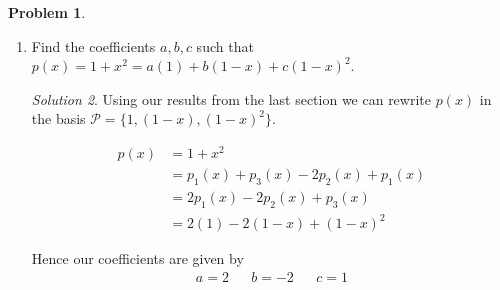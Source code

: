 \documentclass[12pt,a4paper]{article}
\theoremstyle{definition}
\newtheorem{problem}{Problem}
\theoremstyle{remark}
\newtheorem*{solution}{Solution}
\begin{document}
\begin{problem}
\begin{enumerate}
\begin{solution}
        Since each element of the $\mathbb P_2$ basis $\{1, x, x^2\}$ can be represented by a linear combination of $p_i(x) \in \mathcal P$, and since $\mathcal P$ is linearly independent, it follows that $\mathcal P = \{1, (1-x), (1-x)^2\}$ forms a basis for the space of quadratic polynomials.
        \end{solution}
        \item Find the coefficients $a,b,c$ such that $p(x) = 1+x^2=a(1)+b(1-x)+c(1-x)^2$. 
        \begin{solution}
            Using our results from the last section we can rewrite $p(x)$ in the basis $\mathcal P = \{1, (1-x), (1-x)^2\}$. 

            \begin{align*}
                p(x) &= 1+x^2 \\
                &= p_1(x) + p_3(x) - 2p_2(x) + p_1(x) \\
                &= 2 p_1(x) - 2p_2(x) +p_3(x) \\
                &= 2(1) - 2(1-x) + (1-x)^2
            \end{align*}

            Hence our coefficients are given by \begin{align*}
                a = 2 && b=-2 && c=1
            \end{align*}
        \end{solution}
    \end{enumerate}
\end{problem}
\end{document}

